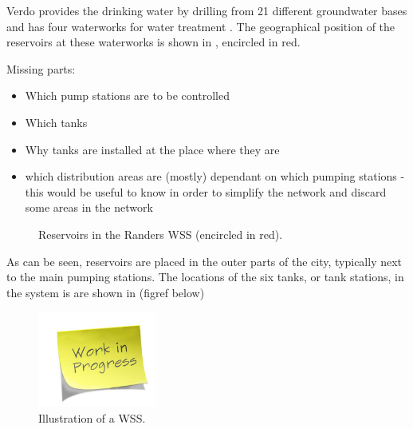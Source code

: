 Verdo provides the drinking water by drilling from 21 different groundwater bases and has four waterworks for water treatment \cite{verdo}. The geographical position of the reservoirs at these waterworks is shown in , encircled in red.   

Missing parts:
\begin{itemize}
  \item Which pump stations are to be controlled
  \item Which tanks 
  \item Why tanks are installed at the place where they are
  \item which distribution areas are (mostly) dependant on which pumping stations - this would be useful to know in order to simplify the network and discard some areas in the network 
\end{itemize}

\begin{figure}[H]
\centering
 
\caption{Reservoirs in the Randers WSS (encircled in red).}
\label{fig:reservoirs_epanet}
\end{figure}

As can be seen, reservoirs are placed in the outer parts of the city, typically next to the main pumping stations. The locations of the six tanks, or tank stations, in the system is are shown in (figref below)

\begin{figure}[H]
\centering
\includegraphics[width=0.35\textwidth]{report/pictures/missingfigure}
\caption{Illustration of a WSS.}
\label{fig:WSS_example}
\end{figure}